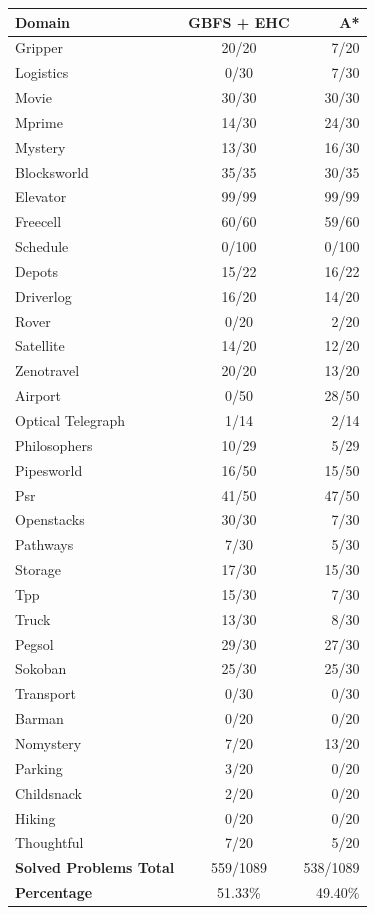 \begin{center}
  \begin{tabular}{ | l | c | r |}
    \hline
    \textbf{Domain} & \textbf{GBFS + EHC} & \textbf{A*} \\ \hline
    Gripper & 20/20 & 7/20 \\ \hline
    Logistics & 0/30 & 7/30 \\ \hline
    Movie & 30/30 & 30/30 \\ \hline
    Mprime & 14/30 & 24/30 \\ \hline
    Mystery & 13/30 & 16/30 \\ \hline
    Blocksworld & 35/35 & 30/35 \\ \hline
    Elevator & 99/99 & 99/99 \\ \hline
    Freecell & 60/60 & 59/60 \\ \hline
    Schedule & 0/100 & 0/100 \\ \hline
    Depots & 15/22 & 16/22 \\ \hline
    Driverlog & 16/20 & 14/20 \\ \hline
    Rover & 0/20 & 2/20 \\ \hline
    Satellite & 14/20 & 12/20 \\ \hline
    Zenotravel & 20/20 & 13/20 \\ \hline
    Airport & 0/50 & 28/50 \\ \hline
    Optical Telegraph & 1/14 & 2/14 \\ \hline
    Philosophers & 10/29 & 5/29 \\ \hline
    Pipesworld & 16/50 & 15/50 \\ \hline
    Psr & 41/50 & 47/50\\ \hline
    Openstacks & 30/30 & 7/30 \\ \hline
    Pathways & 7/30 & 5/30 \\ \hline
    Storage & 17/30 & 15/30 \\ \hline
    Tpp & 15/30 & 7/30 \\ \hline
    Truck & 13/30 & 8/30 \\ \hline
    Pegsol & 29/30 & 27/30 \\ \hline
    Sokoban & 25/30 & 25/30 \\ \hline
    Transport & 0/30 & 0/30 \\ \hline
    Barman & 0/20 & 0/20 \\ \hline
    Nomystery & 7/20 & 13/20 \\ \hline
    Parking & 3/20 & 0/20 \\ \hline
    Childsnack & 2/20 & 0/20 \\ \hline
    Hiking & 0/20 & 0/20 \\ \hline
    Thoughtful & 7/20 & 5/20 \\ \hline
    \textbf{Solved Problems Total} & 559/1089 & 538/1089 \\ \hline
    \textbf{Percentage} & 51.33\% & 49.40\% \\  
    \hline
  \end{tabular}
\end{center}
